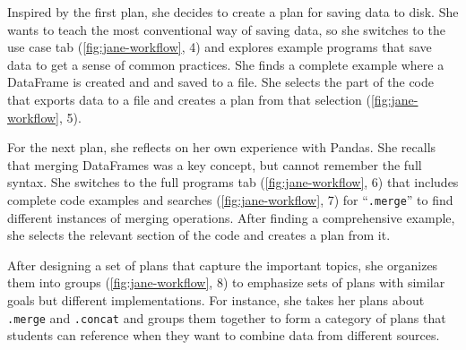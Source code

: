 Inspired by the first plan, she decides to create a plan for saving data to disk. She wants to teach the most conventional way of saving data, so she switches to the use case tab (\cref{fig:jane-workflow}, 4) and explores example programs that save data to get a sense of common practices.  %
She finds a complete example where a DataFrame is created and and saved to a file. %
She selects the part of the code that exports data to a file and creates a plan from that selection (\cref{fig:jane-workflow}, 5).


For the next plan, she reflects on her own experience with Pandas. She recalls that merging DataFrames was a key concept, but cannot remember the full syntax. 
She switches to the full programs tab (\cref{fig:jane-workflow}, 6) that includes complete code examples and searches (\cref{fig:jane-workflow}, 7) for ``\texttt{.merge}'' to find different instances of merging operations. %
After finding a comprehensive example, she selects the relevant section of the code and creates a plan from it.

After designing a set of plans that capture the important topics, she organizes them into groups (\cref{fig:jane-workflow}, 8) 
to emphasize sets of plans with similar goals but different implementations. For instance, she takes her plans about \texttt{.merge} and \texttt{.concat} and groups them together to form a category of plans that students can reference when they want to {combine data from different sources}.


